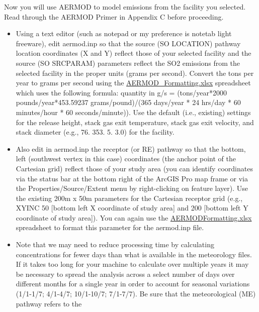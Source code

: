 \documentclass[
  letterpaper,
  DIV=11,
  numbers=noendperiod]{scrartcl}
\begin{document}
Now you will use AERMOD to model emissions from the facility you
selected. Read through the AERMOD Primer in Appendix C before
proceeding.

\begin{itemize}
\item
  Using a text editor (such as notepad or my preference is notetab light
  freeware), edit aermod.inp so that the source (SO LOCATION) pathway
  location coordinates (X and Y) reflect those of your selected facility
  and the source (SO SRCPARAM) parameters reflect the SO2 emissions from
  the selected facility in the proper units (grams per second). Convert
  the tons per year to grams per second using the
  \href{https://github.com/justenvirons/pedagogy/raw/main/GEO346_2022_FallQuarter/Exercise_02/aermod/AERMODFormatting.xls}{AERMOD\_Formatting.xlsx}
  spreadsheet which uses the following formula: quantity in g/s =
  (tons/year*2000 pounds/year*453.59237 grams/pound)/(365 days/year * 24
  hrs/day * 60 minutes/hour * 60 seconds/minute)). Use the default
  (i.e., existing) settings for the release height, stack gas exit
  temperature, stack gas exit velocity, and stack diameter (e.g., 76.
  353. 5. 3.0) for the facility.
\item
  Also edit in aermod.inp the receptor (or RE) pathway so that the
  bottom, left (southwest vertex in this case) coordinates (the anchor
  point of the Cartesian grid) reflect those of your study area (you can
  identify coordinates via the status bar at the bottom right of the
  ArcGIS Pro map frame or via the Properties/Source/Extent menu by
  right-clicking on feature layer). Use the existing 200m x 50m
  parameters for the Cartesian receptor grid (e.g., XYINC 50 {[}bottom
  left X coordinate of study area{]} and 200 {[}bottom left Y coordinate
  of study area{]}). You can again use the
  \href{https://github.com/justenvirons/pedagogy/raw/main/GEO346_2022_FallQuarter/Exercise_02/aermod/AERMODFormatting.xls}{AERMODFormatting.xlsx}
  spreadsheet to format this parameter for the aermod.inp file.
\item
  Note that we may need to reduce processing time by calculating
  concentrations for fewer days than what is available in the
  meteorology files. If it takes too long for your machine to calculate
  over multiple years it may be necessary to spread the analysis across
  a select number of days over different months for a single year in
  order to account for seasonal variations (1/1-1/7; 4/1-4/7; 10/1-10/7;
  7/1-7/7). Be sure that the meteorological (ME) pathway refers to the

\end{itemize}
\end{document}
